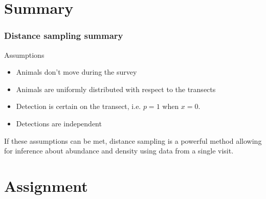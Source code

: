 \documentclass[color=usenames,dvipsnames]{beamer}\usepackage[]{graphicx}\usepackage[]{color}
\begin{document}
\section{Summary}


\begin{frame}
  \frametitle{Distance sampling summary}
  Assumptions
  \begin{itemize}
    \small
    \item Animals don't move during the survey
    \item Animals are uniformly distributed with respect to the
      transects
    \item Detection is certain on the transect, i.e. $p=1$ when $x=0$. 
    \item Detections are independent
  \end{itemize}
  \pause
  \vfill
  \small
  If these assumptions can be met, distance sampling is a powerful
  method allowing for inference about abundance and density using data
  from a single visit. \\
\end{frame}




\section{Assignment}
\end{document}
